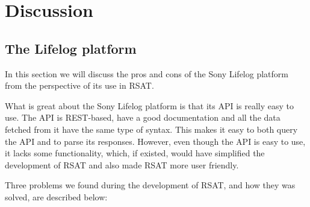 \documentclass{cslthse-msc}
\begin{document}

\chapter{Discussion}

\section{The Lifelog platform}

In this section we will discuss the pros and cons of the Sony Lifelog platform from the perspective of its use in RSAT. 

What is great about the Sony Lifelog platform is that its API is really easy to use. The API is REST-based, have a good documentation and all the data fetched from it have the same type of syntax. This makes it easy to both query the API and to parse its responses. However, even though the API is easy to use, it lacks some functionality, which, if existed, would have simplified the development of RSAT and also made RSAT more user friendly. 

Three problems we found during the development of RSAT, and how they was solved, are described below:
\end{document}
